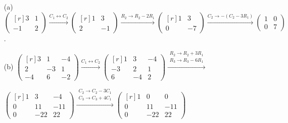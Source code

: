 \documentclass[../algebraNotesMSRI-UP2016.tex]{subfiles}
\begin{document}
\begin{frame}
\begin{itemize}
\item[(a)]$
\! \begin{pmatrix*}[r]
3 & 1 \\
-1 & 2
\end{pmatrix*} \! \xrightarrow{C_1\leftrightarrow C_2} \!
\begin{pmatrix*}[r]
1 & 3 \\
2 & -1 
\end{pmatrix*} \! \xrightarrow{R_2\to R_2-2R_1} \!
%
\! \begin{pmatrix*}[r]
1 & 3 \\
0 & -7
\end{pmatrix*}
\! \xrightarrow{C_2\to -(C_2-3R_1)} \!
\boxed{\begin{pmatrix}
1 & 0 \\
0 & 7
\end{pmatrix}}
$.

\smallGap
\item[(b)]%
$
\begin{pmatrix*}[r]
3 & 1 & -4 \\
2 & -3 & 1 \\
-4 & 6 & -2
\end{pmatrix*}\xrightarrow{C_1\leftrightarrow C_2}
\begin{pmatrix*}[r]
1 & 3 & -4 \\
-3 & 2 & 1 \\
6 & -4 & 2
\end{pmatrix*}
\xrightarrow{\substack{R_2\to R_2+3R_1 \\ R_3\to R_3-6R_1}} 
$
\smallGap %
\begin{center}
$
\begin{pmatrix*}[r]
1 & 3 & -4 \\
0 & 11 & -11 \\
0 & -22 & 22
\end{pmatrix*} %
\xrightarrow{\substack{C_2\to C_2-3C_1 \\ C_3\to C_3+4C_1}}
\begin{pmatrix*}[r]
1 & 0 & 0 \\
0 & 11 & -11 \\
0 & -22 & 22
\end{pmatrix*} 
$
\end{center}%


\end{itemize}
\end{frame}
\end{document}
